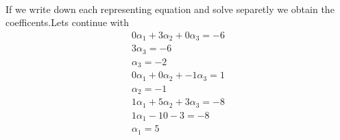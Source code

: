 \documentclass[11pt]{article}
\begin{document}
\paragraph{}If we write down each representing equation and solve separetly we obtain the coefficents.Lets continue with
\begin{eqnarray*}
0\alpha{_1}+3\alpha{_2}+0\alpha{_3}=-6\\
3\alpha_3=-6\\
\alpha_3 = -2
\end{eqnarray*}
\begin{eqnarray*}
0\alpha{_1}+0\alpha{_2}+-1\alpha{_3}=1\\
\alpha_2 = -1
\end{eqnarray*}
\begin{eqnarray*}
1\alpha{_1}+5\alpha{_2}+3\alpha{_3}=-8\\
1\alpha_1 -10-3 =-8\\
\alpha_1 = 5
\end{eqnarray*}
\end{document}
